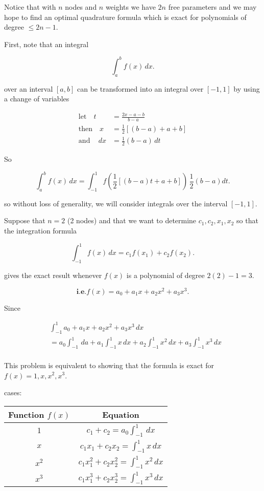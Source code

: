 \documentclass[12pt]{article}
\newcommand{\ie}{\textbf{i.e.}\xspace}
\begin{document}
Notice that with $n$ nodes and $n$ weights we have $2n$ free parameters and we
may hope to find an optimal quadrature formula which is exact for polynomials of
degree $\leq 2n-1$.

First, note that an integral

\[
\int_{a}^{b} f(x) \, dx
.\]

over an interval $[a,b]$ can be transformed into an integral over $[-1, 1]$ by
using a change of variables

\begin{align*}
\text{let}\quad t &= \frac{2x-a-b}{b-a} \\
\text{then}\quad  x &= \frac{1}{2}[(b-a) + a + b] \\
\text{and} \quad \,dx &= \frac{1}{2}(b-a) \,dt
\end{align*}

So 

\[
  \int_{a}^{b} f(x) \, dx = \int_{-1}^{1} f(\frac{1}{2}[(b-a)t + a+b]) \,
  \frac{1}{2}(b-a)dt
.\]

so without loss of generality, we will consider integrals over the interval $[-1,1]$.

Suppose that $n=2$ (2 nodes) and that we want to determine $c_1, c_2, x_1, x_2$
so that the integration formula

\[
\int_{-1}^{1} f(x) \, dx = c_1 f(x_1) + c_2 f(x_2)
.\]

gives the exact result whenever $f(x)$ is a polynomial of degree $2(2)-1 =3$.

\[
\ie f(x) = a_0 + a_1 x + a_2 x^2 + a_3 x^3
.\]

Since 

\begin{align*}
&\int_{-1}^{1} a_0 + a_1 x + a_2 x^2 + a_3x^3 \, dx  \\
&= a_0 \int_{-1}^{1}  \, da + a_1 \int_{-1}^{1} x \, dx + a_2 \int_{-1}^{1} x^2 \, dx + a_3 \int_{-1}^{1} x^3 \, dx \\
\end{align*}

This problem is equivalent to showing that the formula is exact for $f(x) = 1,
x, x^2, x^3$.

cases:

\begin{center}
  \begin{tabular}{c|c}
    Function $f(x)$ & Equation \\
    \hline
    $1$ & $c_1 + c_2 = a_0 \int_{-1}^{1} \, dx$ \\
    $x$ & $c_1x_1 + c_2x_2 = \int_{-1}^{1} x \, dx$ \\
    $x^2$ & $c_1x_1^2 + c_2x_2^2 = \int_{-1}^{1} x^2 \, dx$ \\
    $x^3$ & $c_1x_1^3 + c_2x_2^3 = \int_{-1}^{1} x^3 \, dx$ \\
  \end{tabular}
\end{center}
\end{document}
